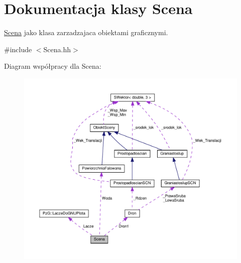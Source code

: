 \hypertarget{classScena}{}\section{Dokumentacja klasy Scena}
\label{classScena}


\hyperlink{classScena}{Scena} jako klasa zarzadzajaca obiektami graficznymi.  




{\ttfamily \#include $<$Scena.\+hh$>$}



Diagram współpracy dla Scena\+:
\nopagebreak
\begin{figure}[H]
\begin{center}
\leavevmode
\includegraphics[width=350pt]{classScena__coll__graph}
\end{center}
\end{figure}
